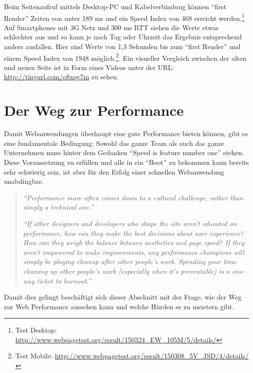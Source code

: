 		Beim Seitenaufruf mittels Desktop-PC und Kabelverbindung können "`first Render"' Zeiten von unter 189 ms und ein Speed Index von 468 erreicht werden.\footnote{Test Desktop: \url{http://www.webpagetest.org/result/150324_EW_105M/5/details/}} Auf Smartphones mit 3G Netz und 300 ms RTT siehen die Werte etwas schlechter aus und so kann je nach Tag oder Uhrzeit das Ergebnis entsprechend anders ausfallen. Hier sind Werte von 1,3 Sekunden bis zum "`first Render"' und einem Speed Index von 1948 möglich.\footnote{Test Mobile: \url{http://www.webpagetest.org/result/150308_5V_JSD/4/details/}}. Ein visueller Vergleich zwischen der alten und neuen Seite ist in Form eines Videos unter der URL: \url{http://tinyurl.com/o8xoy7m} zu sehen.
		


\pagebreak

%	
%


\section{Der Weg zur Performance} %
\label{sec:der_weg_zur_performance}
	Damit Webanwendungen überhaupt eine gute Performance  bieten können, gibt es eine fundamentale Bedingung: Sowohl das ganze Team als auch das ganze Unternehmen muss hinter dem Gedanken "`Speed is feature number one"'\autocite{holzle10} stehen. Diese Voraussetzung zu erfüllen und alle in ein "`Boot"' zu bekommen kann bereits sehr schwierig sein, ist aber für den Erfolg einer schnellen Webanwendung unabdingbar.

	\begin{quote}
		\textit{"`Performance more often comes down to a cultural challenge, rather than simply a technical one."'} \autocite[p. 13]{kovalcin15}

		\textit{"`If other designers and developers who shape the site aren’t educated on performance, how can they make the best decisions about user experience? How can they weigh the balance between aesthetics and page speed? If they aren’t empowered to make improvements, any performance champions will simply be playing cleanup after other people’s work. Spending your time cleaning up other people’s work (especially when it’s preventable) is a one-way ticket to burnout."'} \autocite{hogan14}
	\end{quote}

	Damit dies gelingt beschäftigt sich dieser Abschnitt mit der Frage, wie der Weg zur Web Performance aussehen kann und welche Hürden es zu meistern gibt.

